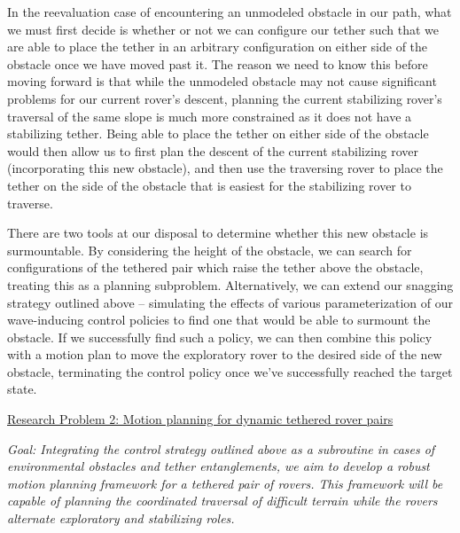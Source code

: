 \documentclass[12pt]{article}
\begin{document}
In the reevaluation case of encountering an unmodeled obstacle in our path, what we must first decide is whether 
or not we can configure our tether such that we are able to place the tether in an arbitrary configuration on either side of the obstacle 
once we have moved past it. The reason we need to know this before moving forward is that while the unmodeled obstacle may not cause 
significant problems for our current rover's descent, planning the current stabilizing rover's traversal of the same slope is much more 
constrained as it does not have a stabilizing tether. Being able to place the tether on either side of the obstacle would then 
allow us to first plan the descent of the current stabilizing rover (incorporating this new obstacle), 
and then use the traversing rover to place the tether on the side of the obstacle that is easiest for the stabilizing rover to traverse. 

There are two tools at our disposal to determine whether this new obstacle is surmountable. By considering the height of the obstacle, 
we can search for configurations of the tethered pair which raise the tether above the obstacle, treating this as a planning subproblem. 
Alternatively, we can extend our snagging strategy outlined above -- simulating the effects of various parameterization of our 
wave-inducing control policies to find one that would be able to surmount the obstacle. If we successfully find such a policy, we can then 
combine this policy with a motion plan to move the exploratory rover to the desired side of the new obstacle, terminating the control policy 
once we've successfully reached the target state.


\noindent\underline{Research Problem 2: Motion planning for dynamic tethered rover pairs }

{\sl Goal: Integrating the control strategy outlined above as a subroutine in cases of environmental obstacles and tether 
entanglements, we aim to develop a robust motion planning framework for a tethered pair of rovers. This framework will be capable 
of planning the coordinated traversal of difficult terrain while the rovers alternate exploratory and stabilizing roles. }
\end{document}

